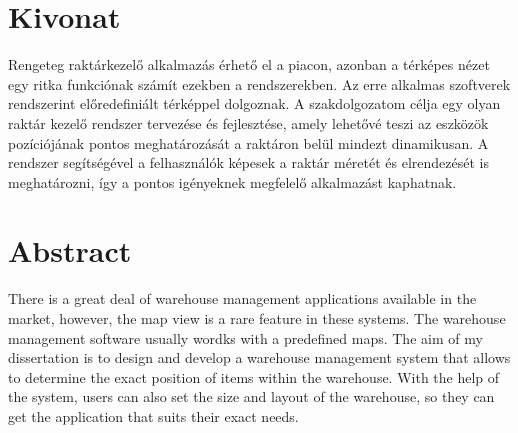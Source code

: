\setcounter{page}{1}

\selecthungarian

\chapter*{Kivonat}

Rengeteg raktárkezelő alkalmazás érhető el a piacon, azonban a térképes nézet egy ritka funkciónak számít ezekben a rendszerekben. Az erre alkalmas szoftverek rendszerint előredefiniált térképpel dolgoznak.
A szakdolgozatom célja egy olyan raktár kezelő rendszer tervezése és fejlesztése, amely lehetővé teszi az eszközök pozíciójának pontos meghatározását a raktáron belül mindezt dinamikusan. A rendszer segítségével a felhasználók képesek a raktár méretét és elrendezését is meghatározni, így a pontos igényeknek megfelelő alkalmazást kaphatnak.

\vfill
\selectenglish

\chapter*{Abstract}

There is a great deal of warehouse management applications available in the market, however, the map view is a rare feature in these systems. The warehouse management software usually wordks with a predefined maps.
The aim of my dissertation is to design and develop a warehouse management system that allows to determine the exact position of items within the warehouse. With the help of the system, users can also set the size and layout of the warehouse, so they can get the application that suits their exact needs.


\vfill
\selectthesislanguage

\setcounter{romanPage}{\value{page}}
